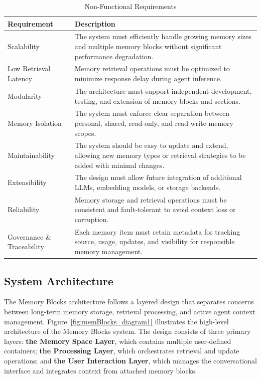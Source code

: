 ﻿\documentclass[12pt,a4paper]{article}
\begin{document}
\begin{table}[H]
\centering
\small
\begin{tabular}{|p{4cm}|p{10cm}|}
\hline
\textbf{Requirement} & \textbf{Description} \\
\hline
Scalability & The system must efficiently handle growing memory sizes and multiple memory blocks without significant performance degradation. \\
\hline
Low Retrieval Latency & Memory retrieval operations must be optimized to minimize response delay during agent inference. \\
\hline
Modularity & The architecture must support independent development, testing, and extension of memory blocks and sections. \\
\hline
Memory Isolation & The system must enforce clear separation between personal, shared, read-only, and read-write memory scopes. \\
\hline
Maintainability & The system should be easy to update and extend, allowing new memory types or retrieval strategies to be added with minimal changes. \\
\hline
Extensibility & The design must allow future integration of additional LLMs, embedding models, or storage backends. \\
\hline
Reliability & Memory storage and retrieval operations must be consistent and fault-tolerant to avoid context loss or corruption. \\
\hline
Governance \& Traceability & Each memory item must retain metadata for tracking source, usage, updates, and visibility for responsible memory management. \\
\hline
\end{tabular}
\caption{Non-Functional Requirements}
\label{tab:non_functional_requirements}
\end{table}


\subsection{System Architecture}

The Memory Blocks architecture follows a layered design that separates concerns between long-term memory storage, retrieval processing, and active agent context management. Figure~\ref{fig:memBlocks_diagram1} illustrates the high-level architecture of the Memory Blocks system. The design consists of three primary layers: \textbf{the Memory Space Layer}, which contains multiple user-defined containers; \textbf{the Processing Layer}, which orchestrates retrieval and update operations; and \textbf{the User Interaction Layer}, which manages the conversational interface and integrates context from attached memory blocks. 
\end{document}
